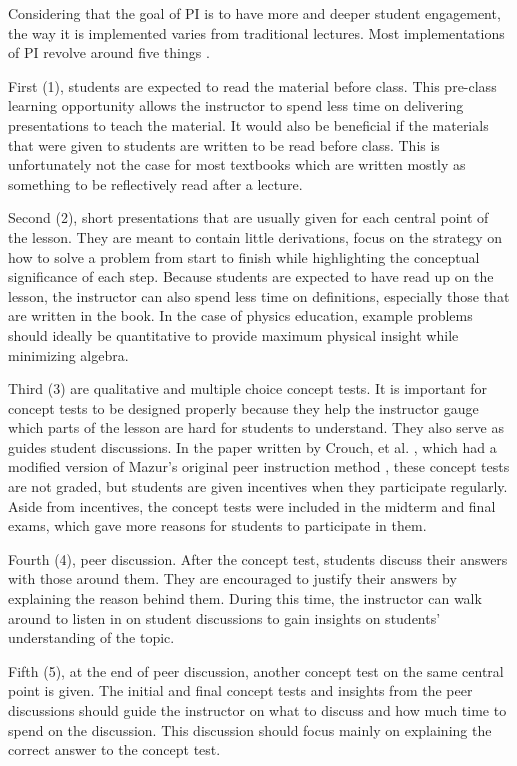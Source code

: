 Considering that the goal of PI is to have more and deeper student engagement, the way it is implemented varies from traditional lectures.
Most implementations of PI revolve around five things \cite{crouch2001peer,mazur1999}.

First (1), students are expected to read the material before class.
This pre-class learning opportunity allows the instructor to spend less time on delivering presentations to teach the material.
It would also be beneficial if the materials that were given to students are written to be read before class.
This is unfortunately not the case for most textbooks which are written mostly as something to be reflectively read after a lecture.

Second (2), short presentations that are usually given for each central point of the lesson.
They are meant to contain little derivations, focus on the strategy on how to solve a problem from start to finish while highlighting the conceptual significance of each step.
Because students are expected to have read up on the lesson, the instructor can also spend less time on definitions, especially those that are written in the book.
In the case of physics education, example problems should ideally be quantitative to provide maximum physical insight while minimizing algebra.

Third (3) are qualitative and multiple choice concept tests. 
It is important for concept tests to be designed properly because they help the instructor gauge which parts of the lesson are hard for students to understand.
They also serve as guides student discussions.
In the paper written by Crouch, et al. \cite{crouch2001peer}, which had a modified version of Mazur's original peer instruction method \cite{mazur1999}, these concept tests are not graded, but students are given incentives when they participate regularly.
Aside from incentives, the concept tests were included in the midterm and final exams, which gave more reasons for students to participate in them.

Fourth (4), peer discussion.
After the concept test, students discuss their answers with those around them.
They are encouraged to justify their answers by explaining the reason behind them.
During this time, the instructor can walk around to listen in on student discussions to gain insights on students' understanding of the topic.

Fifth (5), at the end of peer discussion, another concept test on the same central point is given.
The initial and final concept tests and insights from the peer discussions should guide the instructor on what to discuss and how much time to spend on the discussion.
This discussion should focus mainly on explaining the correct answer to the concept test.

